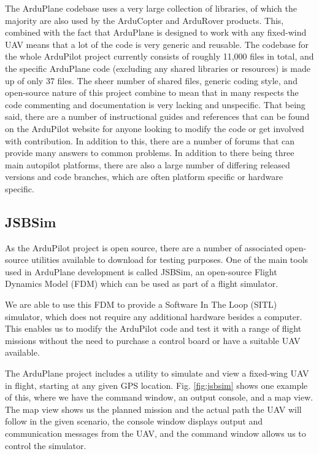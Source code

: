 The ArduPlane codebase uses a very large collection of libraries, of which the majority are also used by the ArduCopter and ArduRover products. This, combined with the fact that ArduPlane is designed to work with any fixed-wind UAV means that a lot of the code is very generic and reusable. The codebase for the whole ArduPilot project currently consists of roughly 11,000 files in total, and the specific ArduPlane code (excluding any shared libraries or resources) is made up of only 37 files. The sheer number of shared files, generic coding style, and open-source nature of this project combine to mean that in many respects the code commenting and documentation is very lacking and unspecific. That being said, there are a number of instructional guides and references that can be found on the ArduPilot website for anyone looking to modify the code or get involved with contribution. In addition to this, there are a number of forums that can provide many answers to common problems. %
In addition to there being three main autopilot platforms, there are also a large number of differing released versions and code branches, which are often platform specific or hardware specific.



\subsection{JSBSim}
\label{intro:jsbsim}

As the ArduPilot project is open source, there are a number of associated open-source utilities available to download for testing purposes. One of the main tools used in ArduPlane development is called JSBSim, an open-source Flight Dynamics Model (FDM) which can be used as part of a flight simulator. %

We are able to use this FDM to provide a Software In The Loop (SITL) simulator, which does not require any additional hardware besides a computer. This enables us to modify the ArduPilot code and test it with a range of flight missions without the need to purchase a control board or have a suitable UAV available. 

The ArduPlane project includes a utility to simulate and view a fixed-wing UAV in flight, starting at any given GPS location. Fig. \ref{fig:jsbsim} shows one example of this, where we have the command window, an output console, and a map view. The map view shows us the planned mission and the actual path the UAV will follow in the given scenario, the console window displays output and communication messages from the UAV, and the command window allows us to control the simulator.

